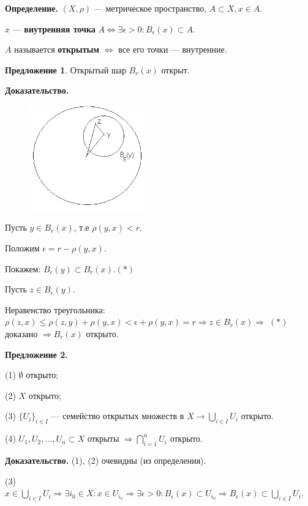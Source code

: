 \documentclass[12pt,a4paper]{article}
\begin{document}
\textbf{Определение.} $(X, \rho)$ --- метрическое пространство, $A \subset X, x \in A.$

$x$ --- \textbf{внутренняя точка} $A \Leftrightarrow \exists \epsilon > 0: B_{\epsilon}(x) \subset A.$ 

$A$ называется \textbf{открытым} $\Leftrightarrow$ все его точки --- внутренние.

\textbf{Предложение 1}. Открытый шар $B_r(x)$ открыт.

\textbf{Доказательство.}

\begin{figure}
	\includegraphics[width = 5cm]{lect2_2.png}
\end{figure}

Пусть $y \in B_r(x)$, т.е $\rho(y,x) < r.$

Положим $\epsilon = r - \rho(y,x).$

Покажем: $B_{\epsilon}(y) \subset B_r(x). (*)$

Пусть $z \in B_{\epsilon}(y).$

Неравенство треугольника: $\rho(z, x) \leqslant \rho(z, y) + \rho(y, x)< \epsilon + \rho(y, x) = r \Rightarrow z \in B_r(x) \Rightarrow \; (*)$ доказано $\Rightarrow B_r(x)$ открыто. 

\textbf{Предложение 2.}

(1) $\emptyset$ открыто;

(2) $X$ открыто;

(3) $\{U_i\}_{i \in I}$ --- семейство открытых множеств в $X \rightarrow \bigcup_{i \in I} U_i$ открыто.

(4) $U_1, U_2, \ldots, U_n \subset X$ открыты $\Rightarrow \bigcap^{n}_{i = 1} U_i$ открыто.

\textbf{Доказательство.} (1), (2) очевидны (из определения).

(3) $x \in \bigcup_{i \in I} U_i \Rightarrow \exists i_0 \in X: x \in U_{i_o} \Rightarrow \exists \epsilon > 0: B_{\epsilon}(x) \subset U_{i_0} \Rightarrow B_{\epsilon}(x) \subset \bigcup_{i \in I} U_i.$
\end{document}
